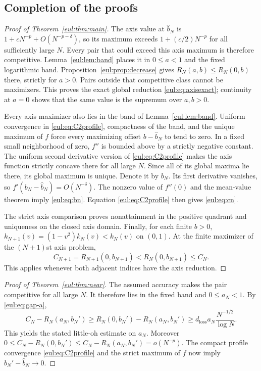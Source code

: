 \documentclass[11pt]{article}
\numberwithin{equation}{section}
\theoremstyle{definition}
\theoremstyle{remark}
\begin{document}
\subsection{Completion of the proofs}
\begin{proof}[Proof of Theorem~\ref{eul:thm:main}]
The axis value at $\widehat b_N$ is
$1+cN^{-p}+O(N^{-p-\delta})$, so its maximum exceeds
$1+(c/2)N^{-p}$ for all sufficiently large $N$.
Every pair that could exceed this axis maximum is therefore competitive.
Lemma~\ref{eul:lem:band} places it in $0\leq a<1$ and the fixed
logarithmic band.  Proposition~\ref{eul:prop:decrease} gives
$R_N(a,b)\leq R_N(0,b)$ there, strictly for $a>0$.
Pairs outside that competitive class cannot be maximizers.  This proves
the exact global reduction \eqref{eul:eq:axisexact}; continuity at $a=0$
shows that the same value is the supremum over $a,b>0$.

Every axis maximizer also lies in the band of Lemma~\ref{eul:lem:band}.
Uniform convergence in \eqref{eul:eq:C2profile}, compactness of the band,
and the unique maximum of $f$ force every maximizing offset
$b-\widehat b_N$ to tend to zero.  In a fixed small neighborhood of
zero, $f''$ is bounded above by a strictly negative constant.  The
uniform second derivative version of \eqref{eul:eq:C2profile} makes the
axis function strictly concave there for all large $N$.
Since all of its global maxima lie there, its global maximum is unique.
Denote it by $b_N$.
Its first derivative vanishes, so
$f'(b_N-\widehat b_N)=O(N^{-\delta})$.
The nonzero value of $f''(0)$ and the mean-value theorem imply
\eqref{eul:eq:bn}.  Equation \eqref{eul:eq:C2profile} then gives
\eqref{eul:eq:cn}.

The strict axis comparison proves nonattainment in the positive quadrant
and uniqueness on the closed axis domain.  Finally, for each finite
$b>0$, $k_{N+1}(v)=(1-v^2)k_N(v)<k_N(v)$ on $(0,1)$.
At the finite maximizer of the $(N+1)$st axis problem,
\[
 C_{N+1}=R_{N+1}(0,b_{N+1})
  <R_N(0,b_{N+1})\leq C_N.
\]
This applies whenever both adjacent indices have the axis reduction.
\end{proof}

\begin{proof}[Proof of Theorem~\ref{eul:thm:near}]
The assumed accuracy makes the pair competitive for all large $N$.
It therefore lies in the fixed band and $0\leq a_N<1$.
By \eqref{eul:eq:gap-a},
\[
 C_N-R_N(a_N,b_N')
 \geq R_N(0,b_N')-R_N(a_N,b_N')
 \geq d_{\mathrm{loss}}a_N\frac{N^{-1/2}}{\log N}.
\]
This yields the stated little-oh estimate on $a_N$.
Moreover
$0\leq C_N-R_N(0,b_N')\leq C_N-R_N(a_N,b_N')=o(N^{-p})$.
The compact profile convergence \eqref{eul:eq:C2profile} and the strict
maximum of $f$ now imply $b_N'-\widehat b_N\to0$.
\end{proof}
\end{document}
